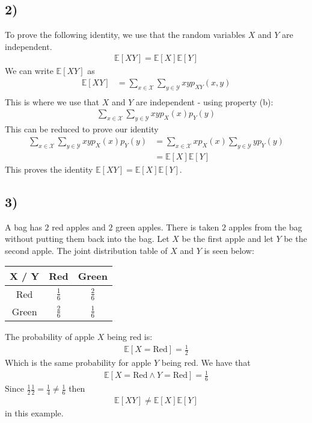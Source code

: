 \documentclass[a4paper]{article}
\begin{document}
\subsection*{2)}
To prove the following identity, we use that the random variables $X$ and $Y$ are independent.
\begin{align*}
\mathbb{E}[XY]=\mathbb{E}[X]\mathbb{E}[Y]
\end{align*}
We can write $\mathbb{E}[XY]$ as
\begin{align*}
\mathbb{E}[XY]           &= \sum_{x\in \mathcal{X}}\sum_{y\in \mathcal{Y}} xy p_{XY}(x,y)\\
\end{align*}
This is where we use that $X$ and $Y$ are independent - using property (b):
\begin{align*}
\sum_{x\in \mathcal{X}}\sum_{y\in \mathcal{Y}} xyp_{X}(x)p_{Y}(y) 
\end{align*}
This can be reduced to prove our identity
\begin{align*} 
\sum_{x\in \mathcal{X}}\sum_{y\in \mathcal{Y}} xyp_{X}(x)p_{Y}(y) &= \sum_{x\in \mathcal{X}}xp_{X}(x)\sum_{y\in \mathcal{Y}} yp_{Y}(y) \\
&= \mathbb{E}[X]\mathbb{E}[Y]
\end{align*}
This proves the identity $\mathbb{E}[XY]=\mathbb{E}[X]\mathbb{E}[Y]$.

\subsection*{3)} 
A bag has $2$ red apples and $2$ green apples. There is taken $2$ apples from the bag without putting them back into the bag. Let $X$ be the first apple and let $Y$ be the second apple. The joint distribution table of $X$ and $Y$ is seen below:
\begin{center}
\begin{tabular}{|c||c|c|} 
\hline 
X / Y & Red & Green \\ 
\hline 
\hline
Red & $\frac{1}{6}$  & $\frac{2}{6}$ \\ 
\hline 
Green & $\frac{2}{6}$ & $\frac{1}{6}$\\ 
\hline
\end{tabular} 
\end{center}
The probability of apple $X$ being red is:
\begin{align*}
\mathbb{E}[X=\mbox{Red}] = \frac{1}{2}
\end{align*}
Which is the same probability for apple $Y$ being red. We have that
\begin{align*}
\mathbb{E}[X=\mbox{Red} \land Y=\mbox{Red}]=\frac{1}{6}
\end{align*}
Since $\frac{1}{2}\frac{1}{2} = \frac{1}{4}\neq\frac{1}{6}$ then 
\begin{align*}
\mathbb{E}[XY]\neq \mathbb{E}[X]\mathbb{E}[Y]
\end{align*}
in this example.
 
\end{document}
